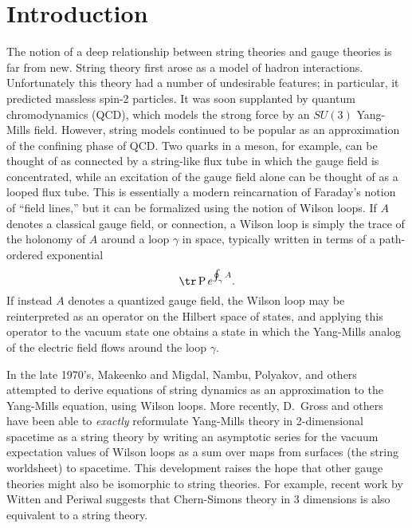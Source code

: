 \section{Introduction}

The notion of a deep relationship between string theories
and gauge theories is far from new.  String theory first arose
as a model of hadron interactions.
Unfortunately this theory had a number of undesirable
features; in particular, it predicted massless spin-2 particles.
It was soon supplanted by quantum chromodynamics (QCD), which models the
strong force by an $SU(3)$ Yang-Mills field.   However, string
models continued to be popular as an approximation of the confining phase
of QCD.  Two quarks in a meson, for
example, can be thought of as connected by a string-like flux tube in
which the gauge field is concentrated, while
an excitation of the gauge field alone can be thought of as a looped
flux tube.   This is essentially a modern reincarnation of
Faraday's notion of ``field lines,'' but it can be formalized using the
notion of Wilson loops.
If $A$ denotes a classical gauge field, or connection, a Wilson
loop is simply the trace of the holonomy of $A$ around a loop $\gamma$ in
space, typically written in terms of a path-ordered exponential
\[           \tr\, {\rm P}\, e^{ \oint_\gamma A }. \]
If instead $A$ denotes a quantized gauge field, the Wilson loop may be
reinterpreted as an operator on the Hilbert space of states, and
applying this operator to the vacuum state one obtains a state
in which the Yang-Mills analog of the electric field flows around
the loop $\gamma$.

In the late 1970's, Makeenko and Migdal, Nambu,
Polyakov, and others \cite{Nambu,Polyakov} attempted to derive
equations of string dynamics as an approximation to
the Yang-Mills equation, using Wilson loops.   More
recently, D.\ Gross and others
\cite{Gross,GT,Minahan,MP,NRS} have been able to {\it exactly} reformulate
Yang-Mills theory in 2-dimensional spacetime as a string theory
by writing an asymptotic series for the
vacuum expectation values of Wilson loops
as a sum over maps from surfaces (the string
worldsheet) to spacetime.   This development raises the hope that other
gauge theories might also be isomorphic to string theories.  For
example, recent work
by Witten \cite{Witten3} and Periwal \cite{Periwal} suggests that
Chern-Simons theory in 3 dimensions is also equivalent to a string
theory.

